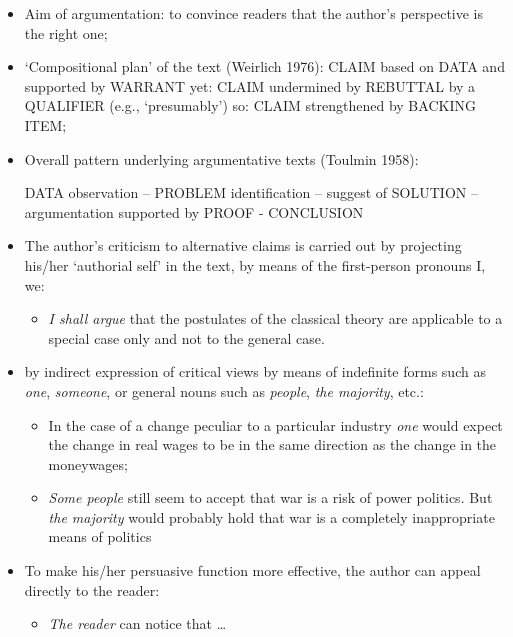 \begin{itemize}

\item Aim of argumentation: to convince readers that the author’s perspective is the right one;
\item ‘Compositional plan’ of the text (Weirlich 1976):
CLAIM based on DATA and supported by WARRANT yet: CLAIM undermined by REBUTTAL by a QUALIFIER (e.g., ‘presumably’) so: CLAIM strengthened by BACKING ITEM;
\item Overall pattern underlying argumentative texts (Toulmin 1958): 
 
DATA observation – PROBLEM identification – suggest of SOLUTION – argumentation supported by PROOF - CONCLUSION 

\item The author’s criticism to alternative claims is carried out by projecting his/her ‘authorial self’ in the text, by means of the first-person pronouns I, we: 

\begin{itemize}
\item \textit{I shall argue} that the postulates of the classical theory are applicable to a special case only and not to the general case.
\end{itemize}

\item by indirect expression of critical views by means of indefinite forms such as \textit{one}, \textit{someone}, or general nouns such as \textit{people}, \textit{the majority}, etc.:
 
\begin{itemize}
\item In the case of a change peculiar to a particular industry \textit{one} would expect the change in real wages to be in the same direction as the change in the moneywages;
\item \textit{Some people} still seem to accept that war is a risk of power politics. But \textit{the majority} would probably hold that war is a completely inappropriate means of politics
\end{itemize}

\item To make his/her persuasive function more effective, the author can appeal directly to the reader: 

\begin{itemize}
\item \textit{The reader} can notice that …
\end{itemize}


\end{itemize}
